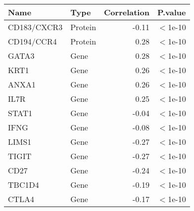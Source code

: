 \begin{tabular}{llrl}
  \hline
Name & Type & Correlation & P.value \\ 
  \hline
CD183/CXCR3 & Protein & -0.11 & $<$1e-10 \\ 
  CD194/CCR4 & Protein & 0.28 & $<$1e-10 \\ 
  GATA3 & Gene & 0.28 & $<$1e-10 \\ 
  KRT1 & Gene & 0.26 & $<$1e-10 \\ 
  ANXA1 & Gene & 0.26 & $<$1e-10 \\ 
  IL7R & Gene & 0.25 & $<$1e-10 \\ 
  STAT1 & Gene & -0.04 & $<$1e-10 \\ 
  IFNG & Gene & -0.08 & $<$1e-10 \\ 
  LIMS1 & Gene & -0.27 & $<$1e-10 \\ 
  TIGIT & Gene & -0.27 & $<$1e-10 \\ 
  CD27 & Gene & -0.24 & $<$1e-10 \\ 
  TBC1D4 & Gene & -0.19 & $<$1e-10 \\ 
  CTLA4 & Gene & -0.17 & $<$1e-10 \\ 
   \hline
\end{tabular}
